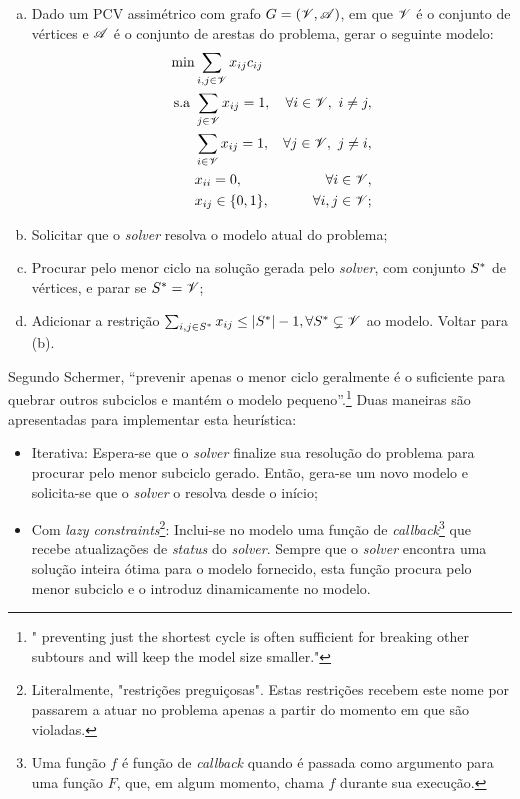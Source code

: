 \begin{enumerate}[(a)]
    \item Dado um PCV assimétrico com grafo $G = (\mathcal{V}, \mathcal{A})$, em que $\mathcal{V}$ é o conjunto de vértices e $\mathcal{A}$ é o conjunto de arestas do problema, gerar o seguinte modelo:
        \begin{align}
            \min& \sum_{i,j \in \mathcal{V}}{x_{ij}c_{ij}}&&\\
            \text{s.a }& \sum_{j \in \mathcal{V}}x_{ij} = 1,&\forall i \in \mathcal{V},\ i \neq j,&\\
            &            \sum_{i \in \mathcal{V}}x_{ij} = 1,&\forall j \in \mathcal{V},\ j \neq i,&\\
            &            x_{ii} = 0,&\forall i \in \mathcal{V},&\\
            &            x_{ij} \in \{0, 1\},&\forall i, j \in \mathcal{V};
        \end{align}
    \item Solicitar que o \emph{solver} resolva o modelo atual do problema;
    \item Procurar pelo menor ciclo na solução gerada pelo \emph{solver}, com conjunto $S^\ast$ de vértices, e parar se $S^\ast = \mathcal{V}$;
    \item Adicionar a restrição $\sum_{i,j \in S^\ast}x_{ij} \leq |S^\ast| - 1, \forall S^\ast\subsetneq \mathcal{V}$ ao modelo. Voltar para (b).
\end{enumerate}

Segundo Schermer, ``prevenir apenas o menor ciclo geralmente é o suficiente para quebrar outros subciclos e mantém o modelo pequeno''.\footnote{"\textelp{} preventing just the shortest cycle is often sufficient for breaking other subtours and will keep the model size smaller."} Duas maneiras são apresentadas para implementar esta heurística:

\begin{itemize}
    \item Iterativa: Espera-se que o \emph{solver} finalize sua resolução do problema para procurar pelo menor subciclo gerado. Então, gera-se um novo modelo e solicita-se que o \emph{solver} o resolva desde o início;
    \item Com \emph{lazy constraints}\footnote{Literalmente, "restrições preguiçosas". Estas restrições recebem este nome por passarem a atuar no problema apenas a partir do momento em que são violadas.}: Inclui-se no modelo uma função de \emph{callback}\footnote{Uma função $f$ é função de \emph{callback} quando é passada como argumento para uma função $F$, que, em algum momento, chama $f$ durante sua execução.} que recebe atualizações de \emph{status} do \emph{solver}. Sempre que o \emph{solver} encontra uma solução inteira ótima para o modelo fornecido, esta função procura pelo menor subciclo e o introduz dinamicamente no modelo.
\end{itemize}

